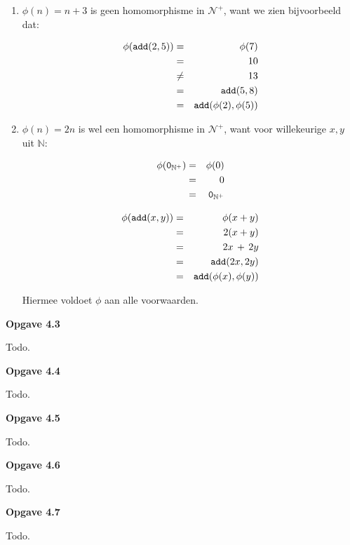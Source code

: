\documentclass[a4paper,11pt]{article}
\begin{document}
\begin{enumerate}

\item %

  $\phi(n) = n+3$ is geen homomorphisme in $\mathcal{N}^{+}$, want we zien
  bijvoorbeeld dat:

  \begin{eqnarray*}
    \phi(\verb|add|(2,5)) & = & \phi(7) \\
                          & = & 10 \\
                          & \ne & 13 \\
                          & = & \verb|add|(5,8) \\
                          & = & \verb|add|(\phi(2),\phi(5))
  \end{eqnarray*}

\item %

  $\phi(n) = 2n$ is wel een homomorphisme in $\mathcal{N}^{+}$, want voor
  willekeurige $x,y$ uit $\mathbb{N}$:

  \begin{eqnarray*}
    \phi(\verb|0|_{\mathbb{N}^{+}}) & = & \phi(0) \\
                                    & = & 0 \\
                                    & = & \verb|0|_{\mathbb{N}^{+}}
  \end{eqnarray*}

  \begin{eqnarray*}
    \phi(\verb|add|(x,y)) & = & \phi(x+y) \\
                          & = & 2(x+y) \\
                          & = & 2x \, + \, 2y \\
                          & = & \verb|add|(2x, 2y) \\
                          & = & \verb|add|(\phi(x), \phi(y))
  \end{eqnarray*}

  Hiermee voldoet $\phi$ aan alle voorwaarden.\\[2em]

\end{enumerate}


{\bf Opgave 4.3}

Todo.


{\bf Opgave 4.4}

Todo.


{\bf Opgave 4.5}

Todo.


{\bf Opgave 4.6}

Todo.


{\bf Opgave 4.7}

Todo.
\end{document}
